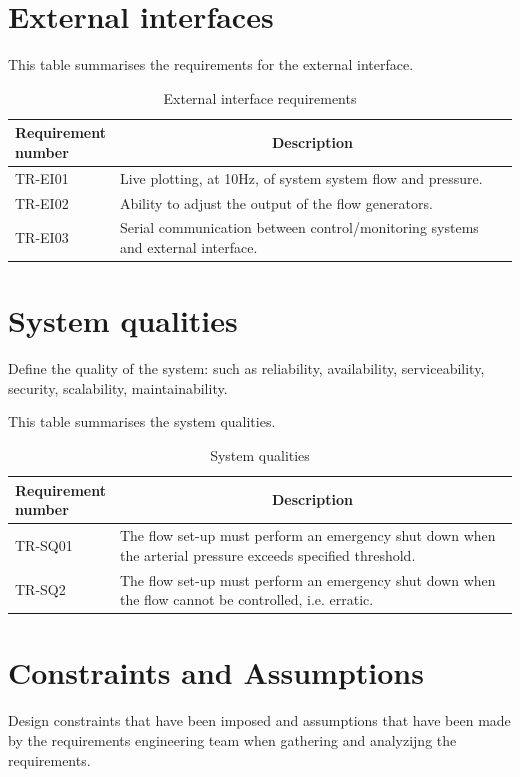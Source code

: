 \section{External interfaces}
\begin{table} [H]
\caption{External interface requirements}
\label{tab:exint}
This table summarises the requirements for the external interface.
\begin{tabular}{l|p{120mm}|}
	\makecell[l]{\textbf{Requirement} \\ \textbf{number}} & \multicolumn{1}{c}{\textbf{Description}}\\
	\hline
	TR-EI01 &  Live plotting, at 10Hz, of system system flow and pressure.\\
	TR-EI02 & Ability to adjust the output of the flow generators. \\
	TR-EI03 & Serial communication between control/monitoring systems and external interface.\\
	\cline{2-2}
\end{tabular}
\end{table}

\section{System qualities}
Define the quality of the system: such as reliability, availability, serviceability, security, scalability, maintainability.
\begin{table} [H]
\caption{System qualities}
\label{tab:sysqual}
This table summarises the system qualities.
\begin{tabular}{l|p{120mm}|}
	\makecell[l]{\textbf{Requirement} \\ \textbf{number}} & \multicolumn{1}{c}{\textbf{Description}}\\
	\hline
	TR-SQ01 & The flow set-up must perform an emergency shut down when the arterial pressure exceeds specified threshold. \\ 
	TR-SQ2 & The flow set-up must perform an emergency shut down when the flow cannot be controlled, i.e. erratic. \\
	\cline{2-2}
\end{tabular}
\end{table}

\section{Constraints and Assumptions}
Design constraints that have been imposed and assumptions that have been made by the requirements engineering team when gathering and analyzijng the requirements.

